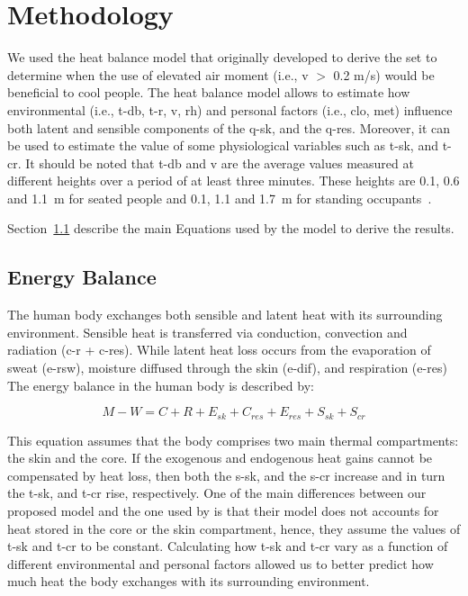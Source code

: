 
\section{Methodology}\label{sec:methodology}

We used the heat balance model that  originally developed to derive the \ac{set} to determine when the use of elevated air moment (i.e., \ac{v} $>$ 0.2 m/s) would be beneficial to cool people.
The heat balance model allows to estimate how environmental (i.e., \ac{t-db}, \ac{t-r}, \ac{v}, \ac{rh}) and personal factors (i.e., \ac{clo}, \ac{met}) influence both latent and sensible components of the \ac{q-sk}, and the \ac{q-res}.
Moreover, it can be used to estimate the value of some physiological variables such as \ac{t-sk}, and \ac{t-cr}.
It should be noted that \ac{t-db} and \ac{v} are the average values measured at different heights over a period of at least three minutes.
These heights are 0.1, 0.6 and 1.1~m for seated people and 0.1, 1.1 and 1.7~m for standing occupants~\cite{ashrae552017}.

Section~\ref{subsec:energy-balance} describe the main Equations used by the model to derive the results.

\subsection{Energy Balance}\label{subsec:energy-balance}

The human body exchanges both sensible and latent heat with its surrounding environment.
Sensible heat is transferred via conduction, convection and radiation (\acs{c-r} + \acs{c-res}).
While latent heat loss occurs from the evaporation of sweat (\acs{e-rsw}), moisture diffused through the skin  (\acs{e-dif}), and respiration (\acs{e-res})
The energy balance in the human body is described by:

\begin{equation}
    M - W = C + R + E_{sk} + C_{res} + E_{res} + S_{sk} + S_{cr}\label{eq:heat-balance}
\end{equation}

This equation assumes that the body comprises two main thermal compartments: the skin and the core.
If the exogenous and endogenous heat gains cannot be compensated by heat loss, then both the \ac{s-sk}, and the \ac{s-cr} increase and in turn the \ac{t-sk}, and \ac{t-cr} rise, respectively.
One of the main differences between our proposed model and the one used by  is that their model does not accounts for heat stored in the core or the skin compartment, hence, they assume the values of \ac{t-sk} and \ac{t-cr} to be constant.
Calculating how \ac{t-sk} and \ac{t-cr} vary as a function of different environmental and personal factors allowed us to better predict how much heat the body exchanges with its surrounding environment.


